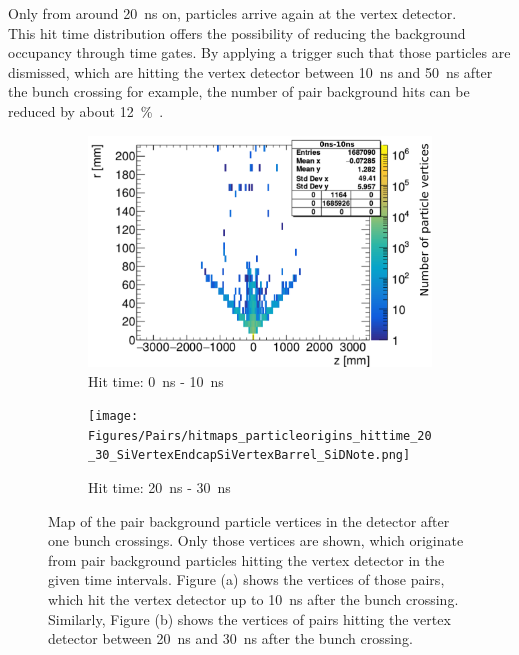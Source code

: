 Only from around \SI{20}{\nano\second} on, particles arrive again at the vertex detector.
\\This hit time distribution offers the possibility of reducing the background occupancy through time gates.
By applying a trigger such that those particles are dismissed, which are hitting the vertex detector between \SI{10}{\nano\second} and \SI{50}{\nano\second} after the bunch crossing for example, the number of pair background hits can be reduced by about \SI{12}{\percent}~\cite[p. 27]{SiDBkgNote}.
 \begin{figure}
 \centering
  \begin{subfigure}[b]{0.49\textwidth}
   \centering
    \includegraphics[width=\textwidth]{Figures/Pairs/hitmaps_particleorigins_hittime_0_10_SiVertexEndcapSiVertexBarrel_SiDNote.png}
   \caption{Hit time: \SI[detect-all]{0}{\nano\second} - \SI[detect-all]{10}{\nano\second}}
   \end{subfigure}
   \hfill
    \begin{subfigure}[b]{0.49\textwidth}
   \centering
    \texttt{[image: Figures/Pairs/hitmaps\_particleorigins\_hittime\_20\_30\_SiVertexEndcapSiVertexBarrel\_SiDNote.png]}
   \caption{Hit time: \SI[detect-all]{20}{\nano\second} - \SI[detect-all]{30}{\nano\second}}
   \end{subfigure}
   \caption[Pair background vertex maps in the \sid detector]{Map of the pair background particle vertices in the \sid detector after one bunch crossings.
   Only those vertices are shown, which originate from pair background particles hitting the \sid vertex detector in the given time intervals.
   Figure (a) shows the vertices of those pairs, which hit the vertex detector up to \SI[detect-all]{10}{\nano\second} after the bunch crossing.
   Similarly, Figure (b) shows the vertices of pairs hitting the vertex detector between \SI[detect-all]{20}{\nano\second} and \SI[detect-all]{30}{\nano\second} after the bunch crossing.
   }
   \label{fig:PairBkg:Origins_Map}
 \end{figure}
 
